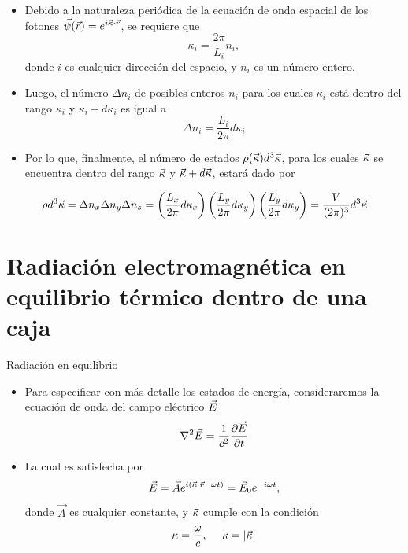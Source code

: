 \documentclass{sintefbeamer}
\begin{document}
\begin{frame}
    \begin{itemize}
        \item Debido a la naturaleza periódica de la ecuación de onda espacial de los fotones $\vec{\psi}(\vec{r})=e^{i\Vec{\kappa}\cdot\vec{r}}$, se requiere que
        \begin{equation}
            \kappa_i=\frac{2\pi}{L_i}n_i ,
        \end{equation}
        donde $i$ es cualquier dirección del espacio, y $n_i$ es un número entero.\pause
        \item Luego, el número $\Delta n_i$ de posibles enteros $n_i$ para los cuales $\kappa_i$ está dentro del rango $\kappa_i$ y $\kappa_i+d\kappa_i$ es igual a
        \begin{equation}
            \Delta n_i=\frac{L_i}{2\pi}d\kappa_i
        \end{equation}\pause
        \item Por lo que, finalmente, el número de estados $\rho(\Vec{\kappa})d^3\Vec{\kappa}$, para los cuales $\Vec{\kappa}$ se encuentra dentro del rango $\Vec{\kappa}$ y $\Vec{\kappa}+d\Vec{\kappa}$, estará dado por
    \end{itemize}
    
    \begin{equation}
        \rho d^3\Vec{\kappa} = \Delta n_x \Delta n_y \Delta n_z = \left(\frac{L_x}{2\pi}d\kappa_x \right) \left(\frac{L_y}{2\pi}d\kappa_y \right) \left(\frac{L_y}{2\pi}d\kappa_y \right) = \frac{V}{(2\pi)^3}d^3\Vec{\kappa}
        \label{eq:NumEstados}
    \end{equation}
\end{frame}

\section{Radiación electromagnética en equilibrio térmico dentro de una caja}
\begin{frame}{Radiación en equilibrio}
    \begin{itemize}
        \item Para especificar con más detalle los estados de energía, consideraremos la ecuación de onda del campo eléctrico $\Vec{E}$
        \begin{equation}
            \nabla^2\Vec{E}=\frac{1}{c^2}\frac{\partial \Vec{E}}{\partial t}
            \label{eq:EWave}
        \end{equation}\pause
        \item La cual es satisfecha por
        \begin{equation}
            \Vec{E} = \Vec{A} e^{i (\Vec{\kappa}\cdot\Vec{r}-\omega t)} = \Vec{E}_0 e^{-i \omega t},
            \label{eq:ESol}
        \end{equation}
        donde $\Vec{A}$ es cualquier constante, y $\Vec{\kappa}$ cumple con la condición
        \begin{equation}
            \kappa = \frac{\omega}{c},\ \ \ \ \kappa = |\Vec{\kappa}|
            \label{eq:kappa}
        \end{equation}
    \end{itemize}
\end{frame}
\end{document}
